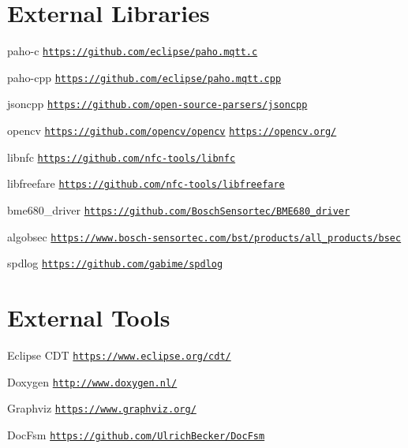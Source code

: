\section*{External Libraries}


\begin{DoxyItemize}
\item paho-\/c \href{https://github.com/eclipse/paho.mqtt.c}{\tt https\+://github.\+com/eclipse/paho.\+mqtt.\+c}
\item paho-\/cpp \href{https://github.com/eclipse/paho.mqtt.cpp}{\tt https\+://github.\+com/eclipse/paho.\+mqtt.\+cpp}
\item jsoncpp \href{https://github.com/open-source-parsers/jsoncpp}{\tt https\+://github.\+com/open-\/source-\/parsers/jsoncpp}
\item opencv \href{https://github.com/opencv/opencv}{\tt https\+://github.\+com/opencv/opencv} \href{https://opencv.org/}{\tt https\+://opencv.\+org/}
\item libnfc \href{https://github.com/nfc-tools/libnfc}{\tt https\+://github.\+com/nfc-\/tools/libnfc}
\item libfreefare \href{https://github.com/nfc-tools/libfreefare}{\tt https\+://github.\+com/nfc-\/tools/libfreefare}
\item bme680\+\_\+driver \href{https://github.com/BoschSensortec/BME680_driver}{\tt https\+://github.\+com/\+Bosch\+Sensortec/\+B\+M\+E680\+\_\+driver}
\item algobsec \href{https://www.bosch-sensortec.com/bst/products/all_products/bsec}{\tt https\+://www.\+bosch-\/sensortec.\+com/bst/products/all\+\_\+products/bsec}
\item spdlog \href{https://github.com/gabime/spdlog}{\tt https\+://github.\+com/gabime/spdlog}
\end{DoxyItemize}

\section*{External Tools}


\begin{DoxyItemize}
\item Eclipse C\+DT \href{https://www.eclipse.org/cdt/}{\tt https\+://www.\+eclipse.\+org/cdt/}
\item Doxygen \href{http://www.doxygen.nl/}{\tt http\+://www.\+doxygen.\+nl/}
\item Graphviz \href{https://www.graphviz.org/}{\tt https\+://www.\+graphviz.\+org/}
\item Doc\+Fsm \href{https://github.com/UlrichBecker/DocFsm}{\tt https\+://github.\+com/\+Ulrich\+Becker/\+Doc\+Fsm} 
\end{DoxyItemize}
